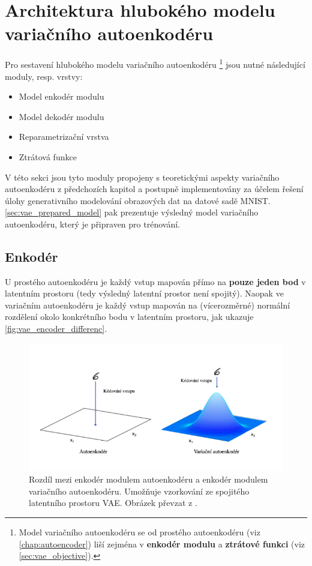 \section{Architektura hlubokého modelu variačního autoenkodéru}
Pro sestavení hlubokého modelu variačního autoenkodéru
\footnote{Model variačního autoenkodéru se od prostého autoenkodéru (viz \autoref{chap:autoencoder}) liší zejména v \textbf{enkodér modulu} a \textbf{ztrátové funkci} (viz \autoref{sec:vae_objective}).} jsou nutné následující moduly, resp. vrstvy:
\begin{itemize}
    \item Model enkodér modulu
    \item Model dekodér modulu
    \item Reparametrizační vrstva
    \item Ztrátová funkce
\end{itemize}

V této sekci jsou tyto moduly propojeny s teoretickými aspekty variačního autoenkodéru z předchozích kapitol a postupně implementovány za účelem řešení úlohy generativního modelování obrazových dat na datové sadě MNIST.
\autoref{sec:vae_prepared_model} pak prezentuje výsledný model variačního autoenkodéru, který je připraven pro trénování.

\subsection{Enkodér}
\label{sec:vae_model_encoder}
U prostého autoenkodéru je každý vstup mapován přímo na \textbf{pouze jeden bod} v latentním prostoru (tedy výsledný latentní prostor není spojitý).
Naopak ve variačním autoenkodéru je každý vstup mapován na (vícerozměrné) normální rozdělení okolo konkrétního bodu v latentním prostoru, jak ukazuje \autoref{fig:vae_encoder_differenc}.

\begin{figure}[H]
    \centering
    \includegraphics[width=\textwidth]{figures/vae_encoder_module.png}
    \caption{Rozdíl mezi enkodér modulem autoenkodéru a enkodér modulem variačního autoenkodéru. Umožňuje vzorkování ze spojitého latentního prostoru VAE. Obrázek převzat z \textcite{Foster2023}.}
    \label{fig:vae_encoder_difference}
\end{figure}

